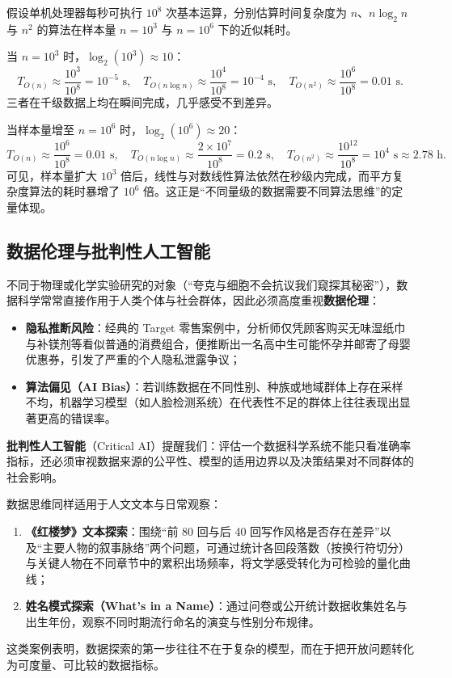 \begin{example}[title={样本规模跃迁对算法耗时的数量级影响}]\label{eg:scale-complexity}
假设单机处理器每秒可执行 $10^8$ 次基本运算，分别估算时间复杂度为 $n$、$n\log_2 n$ 与 $n^2$ 的算法在样本量 $n=10^3$ 与 $n=10^6$ 下的近似耗时。
\begin{solution}
当 $n = 10^3$ 时，$\log_2(10^3)\approx 10$：
\[
  T_{O(n)} \approx \frac{10^3}{10^8} = 10^{-5}\text{ s},\quad
  T_{O(n\log n)} \approx \frac{10^4}{10^8} = 10^{-4}\text{ s},\quad
  T_{O(n^2)} \approx \frac{10^6}{10^8} = 0.01\text{ s}.
\]
三者在千级数据上均在瞬间完成，几乎感受不到差异。

当样本量增至 $n = 10^6$ 时，$\log_2(10^6)\approx 20$：
\[
  T_{O(n)} \approx \frac{10^6}{10^8} = 0.01\text{ s},\quad
  T_{O(n\log n)} \approx \frac{2\times 10^7}{10^8} = 0.2\text{ s},\quad
  T_{O(n^2)} \approx \frac{10^{12}}{10^8} = 10^4\text{ s} \approx 2.78\text{ h}.
\]
可见，样本量扩大 $10^3$ 倍后，线性与对数线性算法依然在秒级内完成，而平方复杂度算法的耗时暴增了 $10^6$ 倍。这正是“不同量级的数据需要不同算法思维”的定量体现。
\end{solution}
\end{example}

\subsection{数据伦理与批判性人工智能}

不同于物理或化学实验研究的对象（“夸克与细胞不会抗议我们窥探其秘密”），数据科学常常直接作用于人类个体与社会群体，因此必须高度重视\textbf{数据伦理}：
\begin{itemize}
  \item \textbf{隐私推断风险}：经典的 Target 零售案例中，分析师仅凭顾客购买无味湿纸巾与补镁剂等看似普通的消费组合，便推断出一名高中生可能怀孕并邮寄了母婴优惠券，引发了严重的个人隐私泄露争议；
  \item \textbf{算法偏见（AI Bias）}：若训练数据在不同性别、种族或地域群体上存在采样不均，机器学习模型（如人脸检测系统）在代表性不足的群体上往往表现出显著更高的错误率。
\end{itemize}
\textbf{批判性人工智能}（Critical AI）提醒我们：评估一个数据科学系统不能只看准确率指标，还必须审视数据来源的公平性、模型的适用边界以及决策结果对不同群体的社会影响。

\begin{example}[title={用数据思维切入人文与日常问题}]\label{eg:hlm-case}
数据思维同样适用于人文文本与日常观察：
\begin{enumerate}
  \item \textbf{《红楼梦》文本探索}：围绕“前 80 回与后 40 回写作风格是否存在差异”以及“主要人物的叙事脉络”两个问题，可通过统计各回段落数（按换行符切分）与关键人物在不同章节中的累积出场频率，将文学感受转化为可检验的量化曲线；
  \item \textbf{姓名模式探索（What's in a Name）}：通过问卷或公开统计数据收集姓名与出生年份，观察不同时期流行命名的演变与性别分布规律。
\end{enumerate}
这类案例表明，数据探索的第一步往往不在于复杂的模型，而在于把开放问题转化为可度量、可比较的数据指标。
\end{example}

